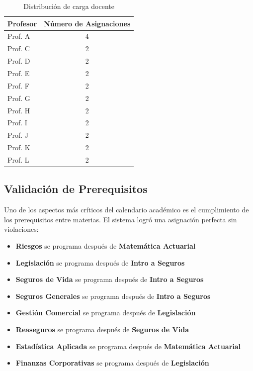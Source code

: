 \begin{table}[htbp]
\centering
\begin{tabular}{|l|c|}
\hline
\textbf{Profesor} & \textbf{Número de Asignaciones} \\
\hline
Prof. A & 4 \\
Prof. C & 2 \\
Prof. D & 2 \\
Prof. E & 2 \\
Prof. F & 2 \\
Prof. G & 2 \\
Prof. H & 2 \\
Prof. I & 2 \\
Prof. J & 2 \\
Prof. K & 2 \\
Prof. L & 2 \\
\hline
\end{tabular}
\caption{Distribución de carga docente}
\label{tab:carga_docente}
\end{table}

\subsection{Validación de Prerequisitos}

Uno de los aspectos más críticos del calendario académico es el cumplimiento de los prerequisitos entre materias. El sistema logró una asignación perfecta sin violaciones:

\begin{itemize}
    \item \textbf{Riesgos} se programa después de \textbf{Matemática Actuarial}
    \item \textbf{Legislación} se programa después de \textbf{Intro a Seguros}
    \item \textbf{Seguros de Vida} se programa después de \textbf{Intro a Seguros}
    \item \textbf{Seguros Generales} se programa después de \textbf{Intro a Seguros}
    \item \textbf{Gestión Comercial} se programa después de \textbf{Legislación}
    \item \textbf{Reaseguros} se programa después de \textbf{Seguros de Vida}
    \item \textbf{Estadística Aplicada} se programa después de \textbf{Matemática Actuarial}
    \item \textbf{Finanzas Corporativas} se programa después de \textbf{Legislación}
\end{itemize}


